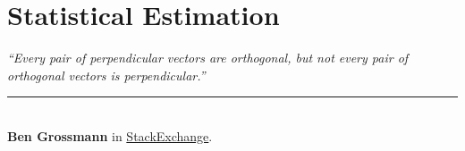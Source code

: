\chapter{Statistical Estimation}\label{p03-chp:statsest}


\begin{flushright}
\textit{``Every pair of perpendicular vectors are orthogonal, but not every pair of orthogonal vectors is perpendicular.''}\\
\rule{0.5\textwidth}{.4pt}\\
\textbf{Ben Grossmann} \small{in \href{https://math.stackexchange.com/questions/2326896/about-perpendicular-vectors}{StackExchange}.}
\end{flushright}
